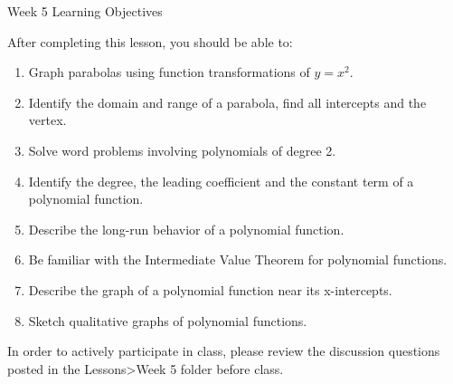 \documentclass[11pt,dvipsnames]{article}
\newenvironment{myfont}{\fontfamily{frc}\selectfont}{\par}
\begin{document}
\begin{center}
\begin{myfont}
{\Large Week 5 Learning Objectives }	
\end{myfont}
\end{center}


After completing this lesson, you should be able to:

\begin{enumerate}[label=\textcolor{blue}{\bf (\arabic*)}]

\item Graph parabolas using function transformations of $\displaystyle y = x^2$.
\item Identify the domain and range of a parabola, find all intercepts and the vertex.
\item Solve word problems involving polynomials of degree 2.
\item Identify the degree, the leading coefficient and the constant term of a polynomial function.
\item Describe the long-run behavior of a polynomial function.
\item Be familiar with the Intermediate Value Theorem for polynomial functions.
\item Describe the graph of a polynomial function near its x-intercepts.
\item Sketch qualitative graphs of polynomial functions.
\end{enumerate}
In order to actively participate in class, please review the discussion questions posted in the Lessons>Week 5 folder before class.
\end{document}
